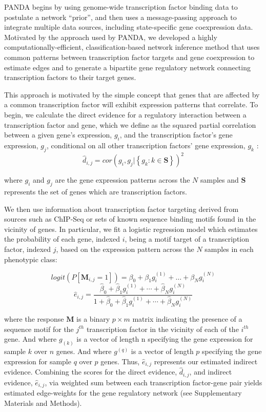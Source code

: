 \documentclass[9pt,twocolumn,twoside]{pnas-new}
\begin{document}
PANDA begins by using genome-wide transcription factor binding data
to postulate a network \textquotedblleft prior\textquotedblright ,
and then uses a message-passing approach to integrate multiple data
sources, including state-specific gene coexpression data. Motivated
by the approach used by PANDA, we developed a highly computationally-efficient,
classification-based network inference method that uses common patterns
between transcription factor targets and gene coexpression to estimate
edges and to generate a bipartite gene regulatory network connecting
transcription factors to their target genes.

This approach is motivated by the simple concept that genes that are
affected by a common transcription factor will exhibit expression
patterns that correlate. To begin, we calculate the direct evidence
for a regulatory interaction between a transcription factor and gene,
which we define as the squared partial correlation between a given
gene\textquoteright s expression, $g_{i}$, and the transcription
factor\textquoteright s gene expression, $g_{j}$, conditional on
all other transcription factors\textquoteright{} gene expression,
$g_{k}$ : 
\[
\hat{d}_{i,j}=cor\left(g_{i},g_{j}|\left\{ g_{k}:k\in\mathbf{S}\right\} \right)^{2}
\]

where $g_{i}$ and $g_{j}$ are the gene expression patterns across
the $N$ samples and $\mathbf{S}$ represents the set of genes which
are transcription factors.

We then use information about transcription factor targeting derived
from sources such as ChIP-Seq or sets of known sequence binding motifs
found in the vicinity of genes. In particular, we fit a logistic regression
model which estimates the probability of each gene, indexed $i$,
being a motif target of a transcription factor, indexed $j$, based
on the expression pattern across the $N$ samples in each phenotypic
class: 

\[
logit(P\left[\mathbf{M}_{i,j}=1\right])=\beta_{0}+\beta_{1}g_{i}^{(1)}+\dots+\beta_{N}g_{i}^{(N)}
\]
\[
\hat{e}_{i,j}=\frac{\hat{\beta}_{0}+\hat{\beta}_{1}g_{i}^{\left(1\right)}+\cdots+\hat{\beta}_{N}g_{i}^{\left(N\right)}}{1+\hat{\beta}_{0}+\hat{\beta}_{1}g_{i}^{\left(1\right)}+\cdots+\hat{\beta}_{N}g_{i}^{\left(N\right)}}
\]

where the response $\mathbf{M}$ is a binary $p\times m$ matrix indicating
the presence of a sequence motif for the $j^{th}$ transcription factor
in the vicinity of each of the $i^{th}$ gene. And where $g_{(k)}$
is a vector of length n specifying the gene expression for sample
$k$ over $n$ genes. And where $g^{\left(q\right)}$ is a vector
of length $p$ specifying the gene expression for sample $q$ over
$p$ genes. Thus, $\hat{e}_{i,j}$ represents our estimated indirect
evidence. Combining the scores for the direct evidence, $\hat{d}_{i,j}$,
and indirect evidence, $\hat{e}_{i,j}$, via weighted sum between
each transcription factor-gene pair yields estimated edge-weights
for the gene regulatory network (see Supplementary Materials and Methods).
\end{document}
